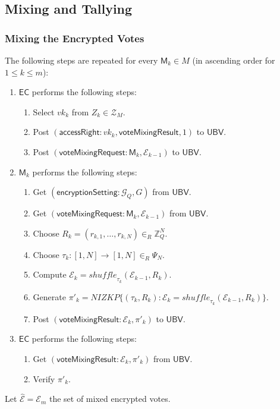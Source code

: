 \documentclass[bibtotoc,halfparskip,oneside]{scrreprt}
\newcommand{\vk}[1]{\mathit{vk}_{#1}\xspace}
\newcommand{\EC}{\ensuremath{\mathsf{EC}}\xspace}
\newcommand{\UBV}{\ensuremath{\mathsf{UBV}}\xspace}
\newcommand{\Mixer}[1]{\ensuremath{\mathsf{M}_{#1}}\xspace}
\begin{document}
	\subsection{Mixing and Tallying}
	
	\subsubsection{Mixing the Encrypted Votes}
	
	The following steps are repeated for every $\Mixer{k}\in M$ (in ascending order for $1\leq k\leq m$):
	\begin{enumerate}
		\item \EC performs the following steps:
		\begin{enumerate}
			\item Select $\vk{k}$ from $Z_{k}\in \mathcal{Z}_{M}$.
			\item Post $(\mathsf{accessRight}:\vk{k},\mathsf{voteMixingResult},1)$ to \UBV.
			\item Post $(\mathsf{voteMixingRequest}:\Mixer{k},\mathcal{E}_{k-1})$ to \UBV.
		\end{enumerate}
		\item $\Mixer{k}$ performs the following steps:
		\begin{enumerate}
			\item Get $(\mathsf{encryptionSetting}:\mathcal{G}_Q,G)$ from \UBV.
			\item Get $(\mathsf{voteMixingRequest}:\Mixer{k}, \mathcal{E}_{k-1})$ from \UBV.
			\item Choose $R_k=(r_{k,1},\ldots,r_{k,N})\in_R\mathbb{Z}_Q^N$.
			\item Choose $\tau_k:[1,N]\rightarrow[1,N]\in_R\Psi_N$.
			\item Compute $\mathcal{E}_k=\mathit{shuffle}_{\tau_k}(\mathcal{E}_{k-1},R_k)$.
			\item Generate $\pi'_{k}=\mathit{NIZKP}\{(\tau_k,R_k): \mathcal{E}_k=\mathit{shuffle}_{\tau_k}(\mathcal{E}_{k-1},R_k)\}$.
			\item Post $(\mathsf{voteMixingResult}:\mathcal{E}_k,\pi'_{k})$ to \UBV.
		\end{enumerate}
		\item \EC performs the following steps:
		\begin{enumerate}
			\item Get $(\mathsf{voteMixingResult}:\mathcal{E}_k,\pi'_{k})$ from \UBV.
			\item Verify $\pi'_{k}$.
		\end{enumerate}
	\end{enumerate}
	Let $\hat{\mathcal{E}}=\mathcal{E}_m$ the set of mixed encrypted votes. 
	
\end{document}
